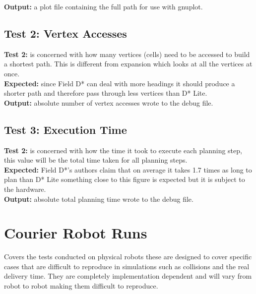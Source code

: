 \noindent
\textbf{Output:} a plot file containing the full path for use with gnuplot.

\subsection{Test 2: Vertex Accesses}

\noindent
\textbf{Test 2:} is concerned with how many vertices (cells) need to be accessed to build a shortest path. This is different from expansion which looks at all the vertices at once.\\

\noindent
\textbf{Expected:} since Field D* can deal with more headings it should produce a shorter path and therefore pass through less vertices than D* Lite.\\

\noindent
\textbf{Output:} absolute number of vertex accesses wrote to the debug file.

\subsection{Test 3: Execution Time}

\noindent
\textbf{Test 2:} is concerned with how the time it took to execute each planning step, this value will be the total time taken for all planning steps.\\

\noindent
\textbf{Expected:} Field D*'s authors claim that on average it takes 1.7 times as long to plan than D* Lite something close to this figure is expected but it is subject to the hardware.\\

\noindent
\textbf{Output:} absolute total planning time wrote to the debug file.


\section{Courier Robot Runs}

Covers the tests conducted on physical robots these are designed to cover specific cases that are difficult to reproduce in simulations such as collisions and the real delivery time. They are completely implementation dependent and will vary from robot to robot making them difficult to reproduce.

